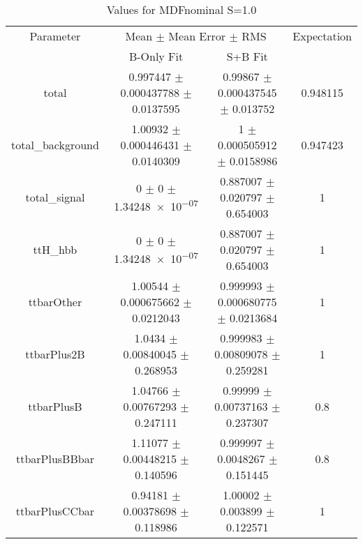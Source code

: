 \begin{table}
\centering
\caption{Values for MDFnominal S=1.0}
\begin{tabular}{cccc}
\toprule
Parameter & \multicolumn{2}{c}{Mean $\pm$ Mean Error $\pm$ RMS} & Expectation\\
 & B-Only Fit & S+B Fit & \\
\midrule
total & \num{0.997447} $\pm$ \num{0.000437788} $\pm$ \num{0.0137595} & \num{0.99867} $\pm$ \num{0.000437545} $\pm$ \num{0.013752} & \num{0.948115}\\
total\_background & \num{1.00932} $\pm$ \num{0.000446431} $\pm$ \num{0.0140309} & \num{1} $\pm$ \num{0.000505912} $\pm$ \num{0.0158986} & \num{0.947423}\\
total\_signal & \num{0} $\pm$ \num{0} $\pm$ \num{1.34248e-07} & \num{0.887007} $\pm$ \num{0.020797} $\pm$ \num{0.654003} & \num{1}\\
ttH\_hbb & \num{0} $\pm$ \num{0} $\pm$ \num{1.34248e-07} & \num{0.887007} $\pm$ \num{0.020797} $\pm$ \num{0.654003} & \num{1}\\
ttbarOther & \num{1.00544} $\pm$ \num{0.000675662} $\pm$ \num{0.0212043} & \num{0.999993} $\pm$ \num{0.000680775} $\pm$ \num{0.0213684} & \num{1}\\
ttbarPlus2B & \num{1.0434} $\pm$ \num{0.00840045} $\pm$ \num{0.268953} & \num{0.999983} $\pm$ \num{0.00809078} $\pm$ \num{0.259281} & \num{1}\\
ttbarPlusB & \num{1.04766} $\pm$ \num{0.00767293} $\pm$ \num{0.247111} & \num{0.99999} $\pm$ \num{0.00737163} $\pm$ \num{0.237307} & \num{0.8}\\
ttbarPlusBBbar & \num{1.11077} $\pm$ \num{0.00448215} $\pm$ \num{0.140596} & \num{0.999997} $\pm$ \num{0.0048267} $\pm$ \num{0.151445} & \num{0.8}\\
ttbarPlusCCbar & \num{0.94181} $\pm$ \num{0.00378698} $\pm$ \num{0.118986} & \num{1.00002} $\pm$ \num{0.003899} $\pm$ \num{0.122571} & \num{1}\\
\bottomrule
\end{tabular}
\end{table}